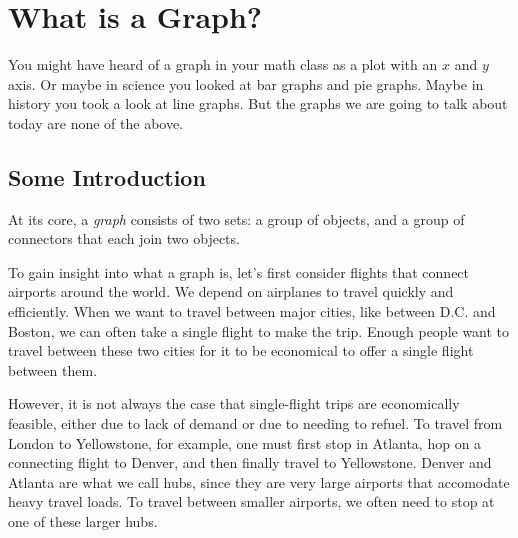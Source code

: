 \documentclass[11pt]{article}
\begin{document}
\section{What is a Graph?}

You might have heard of a graph in your math class as a plot with an $x$ and $y$ axis. Or maybe in science you looked at
bar graphs and pie graphs. Maybe in history you took a look at line graphs. But the graphs we are going to talk about today
are none of the above.

\subsection{Some Introduction}

At its core, a \textit{graph} consists of two sets: a group of objects, and a group of connectors that each join two objects.

To gain insight into what a graph is, let's first consider flights that connect airports around the world.
We depend on airplanes to travel quickly and efficiently. When we want to travel between major cities,
like between D.C. and Boston, we can often take a single flight to make the trip. Enough people want to travel between
these two cities for it to be economical to offer a single flight between them.

However, it is not always the case that single-flight trips are economically feasible, either due to lack of demand
or due to needing to refuel. To travel from London to Yellowstone, for example, one must first stop in Atlanta, hop
on a connecting flight to Denver, and then finally travel to Yellowstone. Denver and Atlanta are what we call
hubs, since they are very large airports that accomodate heavy travel loads. To travel between smaller airports, we often
need to stop at one of these larger hubs.

\begin{center}
\end{center}
\end{document}
